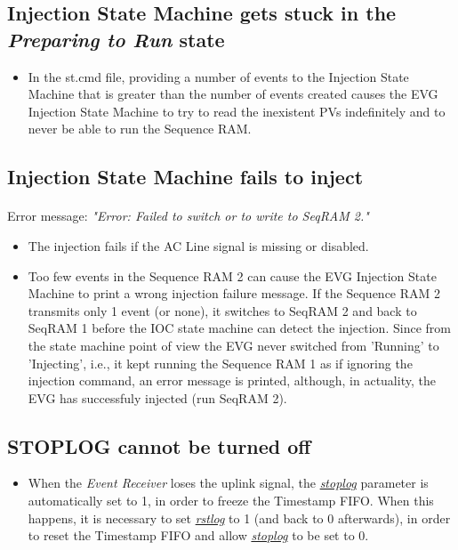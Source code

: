 \documentclass[openany]{article}
\begin{document}
	\subsection{Injection State Machine gets stuck in the \emph{Preparing to Run} state}

		\begin{itemize}
		\item In the st.cmd file, providing a number of events to the Injection State Machine that is greater than the number of events created causes the EVG Injection State Machine to try to read the inexistent PVs indefinitely and to never be able to run the Sequence RAM.
		\end{itemize}

	\subsection{Injection State Machine fails to inject}

		\paragraph{} Error message: \emph{"Error: Failed to switch or to write to SeqRAM 2."}

		\begin{itemize}
		\item The injection fails if the AC Line signal is missing or disabled.
		\item Too few events in the Sequence RAM 2 can cause the EVG Injection State Machine to print a wrong injection failure message. If the Sequence RAM 2 transmits only 1 event (or none), it switches to SeqRAM 2 and back to SeqRAM 1 before the IOC state machine can detect the injection. Since from the state machine point of view the EVG never switched from 'Running' to 'Injecting', i.e., it kept running the Sequence RAM 1 as if ignoring the injection command, an error message is printed, although, in actuality, the EVG has successfuly injected (run SeqRAM 2).
		\end{itemize}

	\subsection{STOPLOG cannot be turned off}

		\begin{itemize}
		\item When the \emph{Event Receiver} loses the uplink signal, the \hyperref[pvgroup:evre-timestamp-log]{\emph{stoplog}} parameter is automatically set to 1, in order to freeze the Timestamp FIFO. When this happens, it is necessary to set \hyperref[pvgroup:evre-timestamp-log]{\emph{rstlog}} to 1 (and back to 0 afterwards), in order to reset the Timestamp FIFO and allow \hyperref[pvgroup:evre-timestamp-log]{\emph{stoplog}} to be set to 0.
		\end{itemize}
\end{document}
